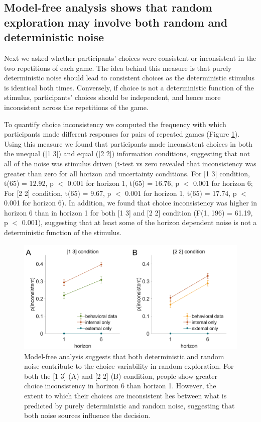 \documentclass[12pt]{article}
\begin{document}
	\subsection*{Model-free analysis shows that random exploration may involve both random and deterministic noise}
	
	Next we asked whether participants' choices were consistent or inconsistent in the two repetitions of each game.  The idea behind this measure is that purely deterministic noise should lead to consistent choices as the deterministic stimulus is identical both times. Conversely, if choice is not a deterministic function of the stimulus, participants' choices should be independent, and hence more inconsistent across the repetitions of the game. 
	
	To quantify choice inconsistency we computed the frequency with which participants made different responses for pairs of repeated games (Figure \ref{fig:mf2}). Using this measure we found that participants made inconsistent choices in both the unequal ([1 3]) and equal ([2 2]) information conditions, suggesting that not all of the noise was stimulus driven (t-test vs zero revealed that inconsistency was greater than zero for all horizon and uncertainty conditions.  For [1 3] condition, t(65) = 12.92, p $<$ 0.001 for horizon 1, t(65) = 16.76, p $<$ 0.001 for horizon 6; For [2 2] condition, t(65) = 9.67, p $<$ 0.001 for horizon 1, t(65) = 17.74, p $<$ 0.001 for horizon 6). In addition, we found that choice inconsistency was higher in horizon 6 than in horizon 1 for both [1 3] and [2 2] condition (F(1, 196) = 61.19, p $<$ 0.001), suggesting that at least some of the horizon dependent noise is not a deterministic function of the stimulus.
	
	\begin{figure}[h]
		\begin{center}
			\includegraphics[width=\textwidth]{figures/theory_da_info.png}
			\caption{Model-free analysis suggests that both deterministic and random noise contribute to the choice variability in random exploration. For both the [1 3] (A) and [2 2] (B) condition, people show greater choice inconsistency in horizon 6 than horizon 1. However, the extent to which their choices are inconsistent lies between what is predicted by purely deterministic and random noise, suggesting that both noise sources influence the decision.}
			\label{fig:mf2}
		\end{center}
	\end{figure}
	
\end{document}
